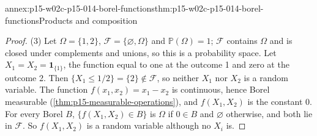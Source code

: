 \begin{annexitem}{annex:p15-w02c-p15-014-borel-functions}{thm:p15-w02c-p15-014-borel-functions}{Products and composition}
\begin{proof}
(3) Let \(\Omega=\{1,2\}\), \(\mathcal F=\{\varnothing,\Omega\}\) and
\(\mathbb P(\Omega)=1\); \(\mathcal F\) contains \(\Omega\) and is closed
under complements and unions, so this is a probability space. Let
\(X_1=X_2=\mathbf1_{\{1\}}\), the function equal to one at the outcome 1
and zero at the outcome 2. Then
\(\{X_1\leq1/2\}=\{2\}\notin\mathcal F\), so neither \(X_1\) nor \(X_2\)
is a random variable. The function \(f(x_1,x_2)=x_1-x_2\) is continuous,
hence Borel measurable (\cref{thm:p15-measurable-operations}), and
\(f(X_1,X_2)\) is the constant 0. For every Borel \(B\),
\(\{f(X_1,X_2)\in B\}\) is \(\Omega\) if \(0\in B\) and \(\varnothing\)
otherwise, and both lie in \(\mathcal F\). So \(f(X_1,X_2)\) is a random
variable although no \(X_i\) is.
\end{proof}
\end{annexitem}

